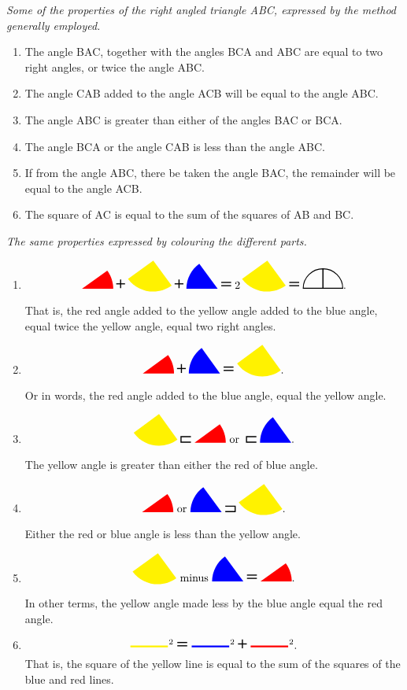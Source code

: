     \begin{center}
        \textit{Some of the properties of the right angled triangle 
        \textrm{ABC}, expressed by the method generally employed.}
    \end{center}

    \begin{enumerate}
        \item The angle BAC, together with the angles BCA and ABC are 
            equal to two right angles, or twice the angle ABC. 
        \item The angle CAB added to the angle ACB will be equal to 
            the angle ABC. 
        \item The angle ABC is greater than either of the 
            angles BAC or BCA. 
        \item The angle BCA or the angle CAB is less than the 
            angle ABC. 
        \item If from the angle ABC, there be taken the angle BAC, 
            the remainder will be equal to the angle ACB. 
        \item The square of AC is equal to the sum of the squares 
            of AB and BC. 
    \end{enumerate}

    \begin{center}
        \textit{The same properties expressed by colouring 
        the different parts.}
    \end{center}

    \begin{enumerate}
        \item \[ \cab \plus \abc \plus \bca \equals 2\, \abc \equals \rightangles.\]
          That is, the red angle added to the yellow angle added to the blue angle, equal twice the yellow angle, equal two right angles. 
      \item \[\cab \plus \bca \equals \abc.\] 
          Or in words, the red angle added to the blue angle, equal the yellow angle. 
      \item \[\abc \greater \cab \text{ or } \greater \bca.\]
          The yellow angle is greater than either the red of blue angle. 
      \item \[\cab \text{ or } \bca \less\abc.\]
          Either the red or blue angle is less than the yellow angle.
      \item \[\abc \text{ minus } \bca \equals \cab.\]
          In other terms, the yellow angle made less by the blue angle equal the red angle. 
      \item \[\tikzhline[yellow]{1.2cm}^{2} \equals \tikzhline[blue]{1.2cm}^{2} \plus \tikzhline[red]{1.2cm}^{2}.\]
          That is, the square of the yellow line is equal to the sum of the squares of the blue and red lines. 
    \end{enumerate}


